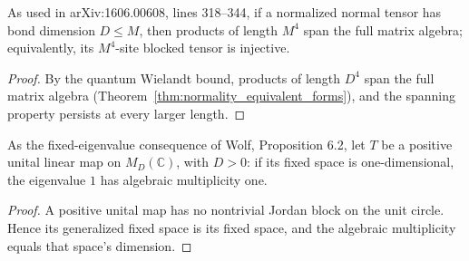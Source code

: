 \begin{lemma}
    \label{lem:spc_aux_bounded_normal_fourth_power_blocking}
    \leanok
    As used in arXiv:1606.00608, lines 318--344, if a normalized normal tensor
    has bond dimension $D\le M$, then products of length $M^4$ span the full
    matrix algebra; equivalently, its $M^4$-site blocked tensor is injective.
\end{lemma}
\begin{proof}\leanok
    By the quantum Wielandt bound, products of length $D^4$ span the full
    matrix algebra (Theorem~\ref{thm:normality_equivalent_forms}), and the
    spanning property persists at every larger length.
\end{proof}

\begin{lemma}
    \label{lem:spc_aux_positive_unital_simple_fixed_eigenvalue}
    \leanok
    As the fixed-eigenvalue consequence of Wolf, Proposition 6.2, let $T$ be
    a positive unital linear map on $M_D(\mathbb C)$, with $D>0$: if its fixed
    space is one-dimensional, the eigenvalue $1$ has algebraic multiplicity
    one.
\end{lemma}
\begin{proof}\leanok
    A positive unital map has no nontrivial Jordan block on the unit circle.
    Hence its generalized fixed space is its fixed space, and the algebraic
    multiplicity equals that space's dimension.
\end{proof}

